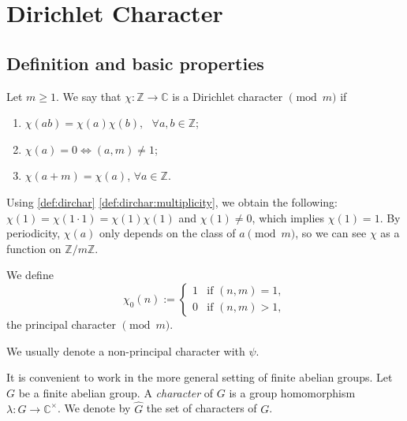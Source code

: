 \section{Dirichlet Character}

\subsection{Definition and basic properties}
\begin{definition}\label{def:dirchar}
    Let $m \ge 1$. We say that $\chi : \mathbb{Z} \to \mathbb{C}$ is a Dirichlet character $\pmod m$ if
    \begin{enumerate}[label={\upshape\roman*)}]
        \item\label{def:dirchar:multiplicity}$\chi(ab) = \chi(a)\chi(b), \text{ } \forall a,b \in \mathbb{Z}$;
        \item\label{def:dirchar:zero_condition}$\chi(a) =0 \Leftrightarrow (a,m) \neq1$;
        \item\label{def:dirchar:periodicity}$\chi(a+m) = \chi(a)$, $\forall a \in \mathbb{Z}$.
    \end{enumerate}
\end{definition}
Using \cref{def:dirchar} \ref{def:dirchar:multiplicity}, we obtain the following: $\chi(1)= \chi(1\cdot1) = \chi(1)\chi(1)$ and $\chi(1)\neq0$, which implies $\chi(1)=1$. By periodicity, $\chi(a)$ only depends on the class of $a \pmod m$, so we can see $\chi$ as a function on $\mathbb{Z}/m\mathbb{Z}$.

\begin{definition}
    We define
    $$\chi_0(n):=
    \begin{cases}
        1 & \text{if } (n,m)=1,\\
        0 & \text{if } (n,m) > 1,
    \end{cases}$$
    the principal character $\pmod m$.
\end{definition}
We usually denote a non-principal character with $\psi$.

It is convenient to work in the more general setting of finite abelian groups. Let $G$ be a finite abelian group. A \emph{character} of $G$ is a group homomorphism $\lambda : G\to\mathbb{C}^\times$. We denote by $\widehat G$ the set of characters of $G$.

